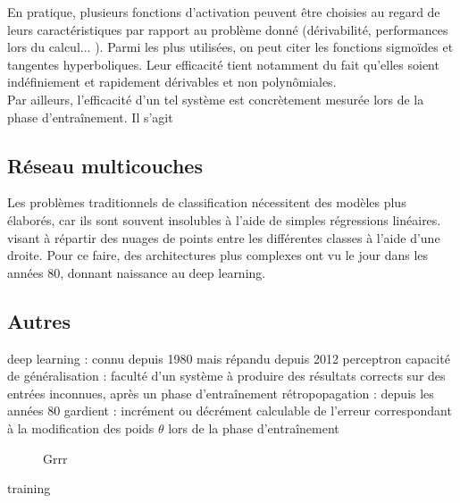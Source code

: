\documentclass[a4paper,10pt]{report}
\begin{document}
En pratique, plusieurs fonctions d'activation peuvent être choisies au regard de leurs caractéristiques par rapport au problème donné (dérivabilité, performances lors du calcul... ).
Parmi les plus utilisées, on peut citer les fonctions sigmoïdes et tangentes hyperboliques. Leur efficacité tient notamment du fait qu'elles soient indéfiniement et rapidement dérivables et non polynômiales.
\\

Par ailleurs, l'efficacité d'un tel système est concrètement mesurée lors de la phase d'entraînement. Il s'agit

\subsection{Réseau multicouches}

Les problèmes traditionnels de classification nécessitent des modèles plus élaborés, car ils sont souvent insolubles à l'aide de simples régressions linéaires.
visant à répartir des nuages de points entre les différentes classes à l'aide d'une droite.
Pour ce faire, des architectures plus complexes ont vu le jour dans les années 80, donnant naissance au deep learning.



\subsection{Autres}
deep learning : connu depuis 1980 mais répandu depuis 2012
perceptron
capacité de généralisation : faculté d'un système à produire des résultats corrects sur des entrées inconnues, après un phase d'entraînement
rétropopagation : depuis les années 80
gardient : incrément ou décrément calculable de l'erreur correspondant à la modification des poids $\theta$ lors de la phase d'entraînement

\begin{figure}[H]
    \centering
    \makebox[\textwidth]{}
    \caption{Grrr}
    \label{fig:c1p2s1}
\end{figure}


\gls{training}


\printglossaries
\end{document}
